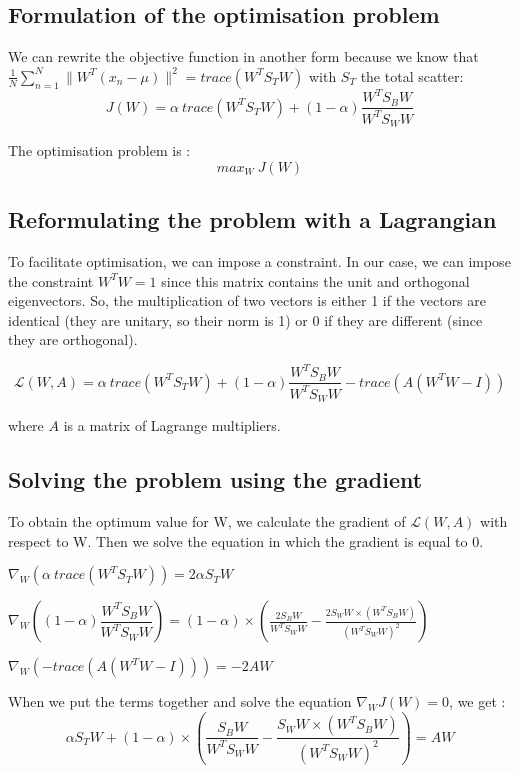 \subsection{Formulation of the optimisation problem}

We can rewrite the objective function in another form because we know that $ \frac{1}{N} \sum_{n = 1}^{N}{\lVert W^T(x_n - \mu) \rVert^2} = trace(W^TS_TW) $ with $S_T$ the total scatter: $$ J(W) = \alpha \ trace(W^TS_TW) + (1 - \alpha) \dfrac{W^TS_BW}{W^TS_WW}  $$

The optimisation problem is : $$max_W \ J(W)$$

\subsection{Reformulating the problem with a Lagrangian}

To facilitate optimisation, we can impose a constraint. In our case, we can impose the constraint $W^TW = 1$ since this matrix contains the unit and orthogonal eigenvectors. So, the multiplication of two vectors is either 1 if the vectors are identical (they are unitary, so their norm is 1) or 0 if they are different (since they are orthogonal).

$$\mathcal{L}(W,A) = \alpha \ trace(W^TS_TW) + (1 - \alpha) \dfrac{W^TS_BW}{W^TS_WW} - trace(A(W^TW - I))$$

where $A$ is a matrix of Lagrange multipliers.

\subsection{Solving the problem using the gradient}

To obtain the optimum value for W, we calculate the gradient of $\mathcal{L}(W,A)$ with respect to W. Then we solve the equation in which the gradient is equal to 0.
\newline 

$\nabla_W (\alpha \ trace(W^TS_TW)) = 2\alpha S_T W$

$\nabla_W ((1 - \alpha) \dfrac{W^TS_BW}{W^TS_WW}) = (1 - \alpha) \times (\frac{2S_BW}{W^TS_WW} - \frac{2S_WW \times (W^TS_BW)}{(W^TS_WW)^2}) $

$\nabla_W (- trace(A(W^TW - I))) = -2AW $
\newline

When we put the terms together and solve the equation $\nabla_WJ(W) = 0$, we get : 
$$\alpha S_T W + (1 - \alpha) \times (\frac{S_BW}{W^TS_WW} - \frac{S_WW \times (W^TS_BW)}{(W^TS_WW)^2}) = AW$$

